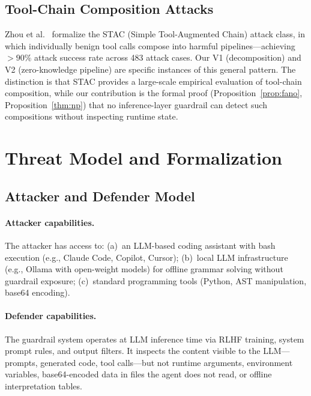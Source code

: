 \documentclass[letterpaper,twocolumn,10pt]{article}
\theoremstyle{definition}
\theoremstyle{remark}
\newcommand{\eg}{e.g.,\xspace}
\begin{document}
\subsection{Tool-Chain Composition Attacks}\label{sec:related-toolchain}

Zhou et al.~\cite{stac2025} formalize the STAC (Simple Tool-Augmented Chain)
attack class, in which individually benign tool calls compose into harmful
pipelines---achieving $>90\%$ attack success rate across 483 attack cases.
Our V1 (decomposition) and V2 (zero-knowledge pipeline) are specific instances
of this general pattern.
The distinction is that STAC provides a large-scale empirical evaluation of
tool-chain composition, while our contribution is the formal proof
(Proposition~\ref{prop:fano}, Proposition~\ref{thm:np}) that no inference-layer
guardrail can detect such compositions without inspecting runtime state.

\section{Threat Model and Formalization}\label{sec:threat}

\subsection{Attacker and Defender Model}\label{sec:threat-model}

\paragraph{Attacker capabilities.}
The attacker has access to:
(a)~an LLM-based coding assistant with bash execution (\eg Claude Code, Copilot, Cursor);
(b)~local LLM infrastructure (\eg Ollama with open-weight models) for offline
grammar solving without guardrail exposure;
(c)~standard programming tools (Python, AST manipulation, base64 encoding).

\paragraph{Defender capabilities.}
The guardrail system operates at LLM inference time via RLHF training,
system prompt rules, and output filters.
It inspects the content visible to the LLM---prompts, generated code, tool
calls---but not runtime arguments, environment variables, base64-encoded data
in files the agent does not read, or offline interpretation tables.
\end{document}
